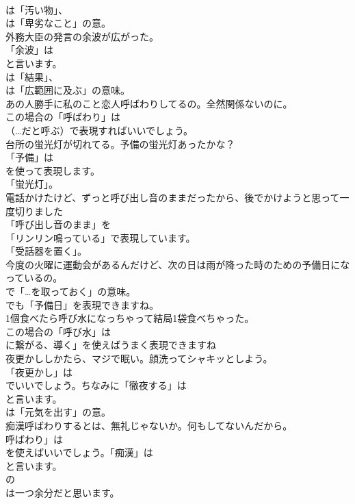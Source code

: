 \documentclass[8pt]{extreport}
\begin{document}
\begin{CJK}{UTF8}{min}
\\	は「汚い物」、
\\	は「卑劣なこと」の意。	
\\	外務大臣の発言の余波が広がった。 
\\	「余波」は 
\\	と言います。
\\	は「結果」、
\\	は「広範囲に及ぶ」の意味。	
\\	あの人勝手に私のこと恋人呼ばわりしてるの。全然関係ないのに。 
\\	この場合の「呼ばわり」は 
\\	（…だと呼ぶ）で表現すればいいでしょう。	
\\	台所の蛍光灯が切れてる。予備の蛍光灯あったかな？ 
\\	「予備」は
\\	を使って表現します。
\\	「蛍光灯」。	
\\	電話かけたけど、ずっと呼び出し音のままだったから、後でかけようと思って一度切りました 
\\	「呼び出し音のまま」を
\\	「リンリン鳴っている」で表現しています。
\\	「受話器を置く」。	
\\	今度の火曜に運動会があるんだけど、次の日は雨が降った時のための予備日になっているの。 
\\	で「…を取っておく」の意味。
\\	でも「予備日」を表現できますね。	
\\	1個食べたら呼び水になっちゃって結局1袋食べちゃった。 
\\	この場合の「呼び水」は
\\	に繋がる、導く」を使えばうまく表現できますね	
\\	夜更かししかたら、マジで眠い。顔洗ってシャキッとしよう。 
\\	「夜更かし」は
\\	でいいでしょう。ちなみに「徹夜する」は
\\	と言います。
\\	は「元気を出す」の意。	
\\	痴漢呼ばわりするとは、無礼じゃないか。何もしてないんだから。 
\\	呼ばわり」は
\\	を使えばいいでしょう。「痴漢」は
\\	と言います。	
\\	の 
\\	は一つ余分だと思います。 

\end{CJK}
\end{document}
